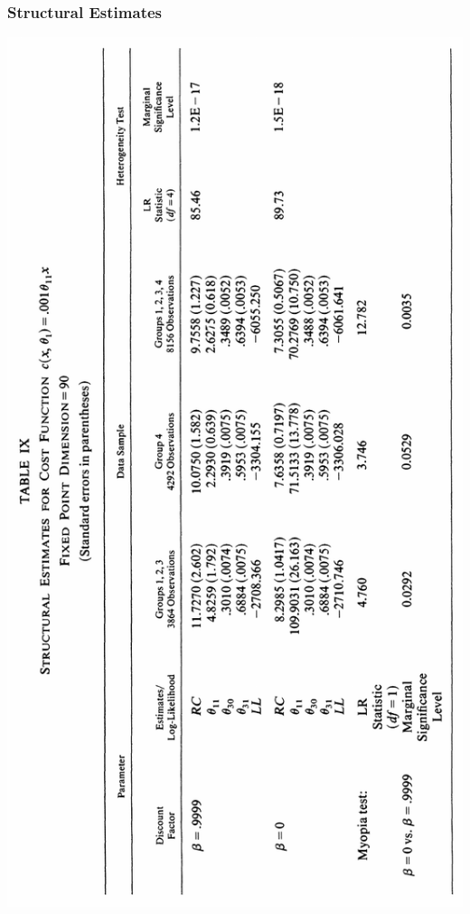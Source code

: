 \documentclass{beamer}
\begin{document}
\begin{frame}\frametitle{Structural Estimates}
	\centering
    \includegraphics[angle=270, width=\textwidth]{estimates.png}
\end{frame}
\end{document}
